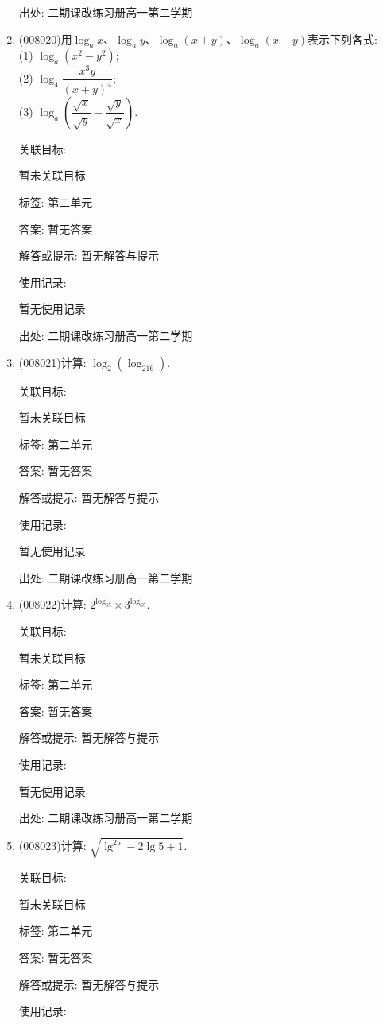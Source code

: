 \documentclass[10pt,a4paper]{article}
\begin{document}
\begin{enumerate}[1.]
出处: 二期课改练习册高一第二学期
\item { (008020)}用$\log _ax$、$\log _ay$、$\log _a(x+y)$、$\log _a(x-y)$表示下列各式:\\
(1) $\log _a(x^2-y^2)$;\\
(2) $\log _4\dfrac{x^3y}{(x+y)^4}$;\\
(3) $\log _a(\dfrac{\sqrt x}{\sqrt y}-\dfrac{\sqrt y}{\sqrt x})$.


关联目标:

暂未关联目标



标签: 第二单元

答案: 暂无答案

解答或提示: 暂无解答与提示

使用记录:

暂无使用记录


出处: 二期课改练习册高一第二学期
\item { (008021)}计算: $\log _2(\log _216)$.


关联目标:

暂未关联目标



标签: 第二单元

答案: 暂无答案

解答或提示: 暂无解答与提示

使用记录:

暂无使用记录


出处: 二期课改练习册高一第二学期
\item { (008022)}计算: $2^{\log _65}\times 3^{\log _65}$.


关联目标:

暂未关联目标



标签: 第二单元

答案: 暂无答案

解答或提示: 暂无解答与提示

使用记录:

暂无使用记录


出处: 二期课改练习册高一第二学期
\item { (008023)}计算: $\sqrt {\lg^25-2\lg 5+1}$.


关联目标:

暂未关联目标



标签: 第二单元

答案: 暂无答案

解答或提示: 暂无解答与提示

使用记录:


\end{enumerate}
\end{document}
